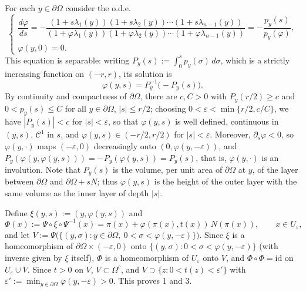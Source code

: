 \documentclass[10pt,a4paper]{amsart}
\theoremstyle{plain}
\begin{document}
{For each $y \in \partial\Omega$ consider the o.d.e.}
\begin{equation}
 \label{diff_equation} \begin{cases}
 \dfrac{d\varphi}{ds} = -\dfrac{(1+ s \lambda_1(y))(1+ s \lambda_2(y))
 \cdots(1+ s \lambda_{n-1}(y))}{(1+ \varphi \lambda_1(y))(1+ \varphi \lambda_2(y))
 \cdots(1+ \varphi \lambda_{n-1}(y))} {= -\dfrac{p_y(s)}{p_y(\varphi)}},\\[2mm]
 \varphi(y,0) = 0.
\end{cases} \end{equation}
{This equation is separable: writing $P_y(s) := \int_0^s p_y(\sigma)\, d\sigma$, which is a strictly increasing function on $(-r,r)$, its solution is
\[ \varphi(y,s) = P_y^{-1}\big(-P_y(s)\big). \]
By continuity and compactness of $\partial\Omega$, there are $c, C > 0$ with $P_y(r/2) \geq c$ and $0 < p_y(s) \leq C$ for all $y \in \partial\Omega$, $|s| \leq r/2$; choosing $0 < \varepsilon < \min\{r/2, c/C\}$, we have $|P_y(s)| < c$ for $|s| < \varepsilon$, so that $\varphi(y,s)$ is well defined, continuous in $(y,s)$, $\mathcal{C}^1$ in $s$, and $\varphi(y,s) \in (-r/2,r/2)$ for $|s| < \varepsilon$.
Moreover, $\partial_s\varphi < 0$, so $\varphi(y,\cdot)$ maps $(-\varepsilon, 0)$ decreasingly onto $(0, \varphi(y,-\varepsilon))$, and $P_y(\varphi(y,\varphi(y,s))) = -P_y(\varphi(y,s)) = P_y(s)$, that is, $\varphi(y,\cdot)$ is an involution.
Note that $P_y(s)$ is the volume, per unit area of $\partial\Omega$ at $y$, of the layer between $\partial \Omega$ and $\partial\Omega + sN$; thus $\varphi(y,s)$ is the height of the outer layer with the same volume as the inner layer of depth $|s|$.}

{Define $\xi(y,s) := (y, \varphi(y,s))$ and
  \begin{equation*}
   \Phi(x) := \Psi\circ\xi\circ\Psi^{-1}(x) = \pi(x) + \varphi( \pi(x), t(x))\, N(\pi(x)), \qquad x \in U_\varepsilon,
  \end{equation*}
and let $V := \Psi\big(\{(y,\sigma) : y \in\partial\Omega,\ 0 < \sigma < \varphi(y,-\varepsilon)\}\big)$.
Since $\xi$ is a homeomorphism of $\partial\Omega\times(-\varepsilon,0)$ onto $\{(y,\sigma): 0<\sigma<\varphi(y,-\varepsilon)\}$ (with inverse given by $\xi$ itself), $\Phi$ is a homeomorphism of $U_\varepsilon$ onto $V$, and $\Phi\circ\Phi = \mathrm{id}$ on $U_\varepsilon\cup V$. Since $t > 0$ on $V$, $V \subset \Omega^c$, and $V \supset \{z : 0 < t(z) < \varepsilon'\}$ with $\varepsilon' := \min_{y\in\partial\Omega} \varphi(y,-\varepsilon) > 0$. This proves 1 and 3.}
\end{document}
